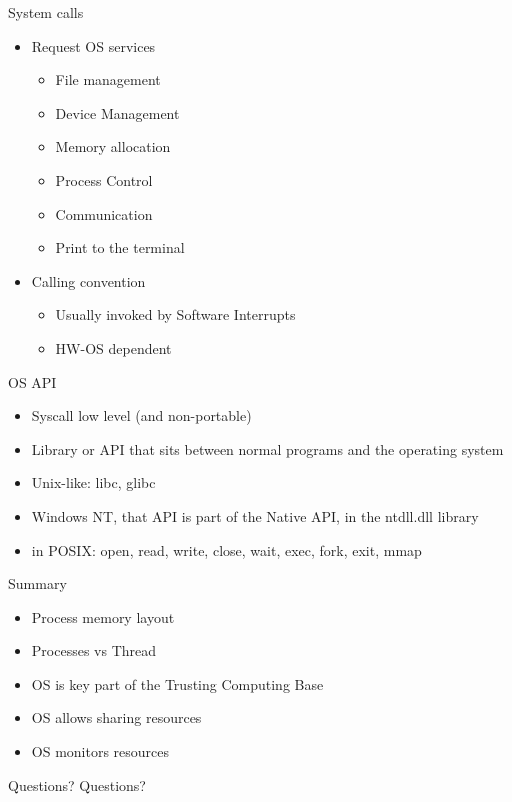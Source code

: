\documentclass{beamer}
\begin{document}
\begin{frame}{System calls}
    \begin{itemize}
      \item Request OS services
    \begin{itemize}
      \item File management
      \item Device Management
      \item Memory allocation
      \item Process Control
      \item Communication
      \item Print to the terminal
   \end{itemize}
   \item Calling convention
    \begin{itemize}
    \item Usually invoked by Software Interrupts
    \item HW-OS dependent
   \end{itemize}
   \end{itemize}
\end{frame}

\begin{frame}{OS API}
    \begin{itemize}
    \item Syscall low level (and non-portable)
    \item Library or API that sits between normal programs and the
      operating system 
    \item Unix-like: libc, glibc
    \item Windows NT, that API is part of the Native API, in the
      ntdll.dll library
    \item in POSIX: open, read, write, close, wait, exec, fork, exit, mmap
    \end{itemize}
\end{frame}



\begin{frame}{Summary}
  \begin{itemize}
    \item Process memory layout
    \item Processes vs Thread
    \item OS is key part of the Trusting Computing Base
    \item OS allows sharing resources
    \item OS monitors resources
  \end{itemize}
\end{frame}

\begin{frame}{Questions?}
    Questions?
\end{frame}
\end{document}
